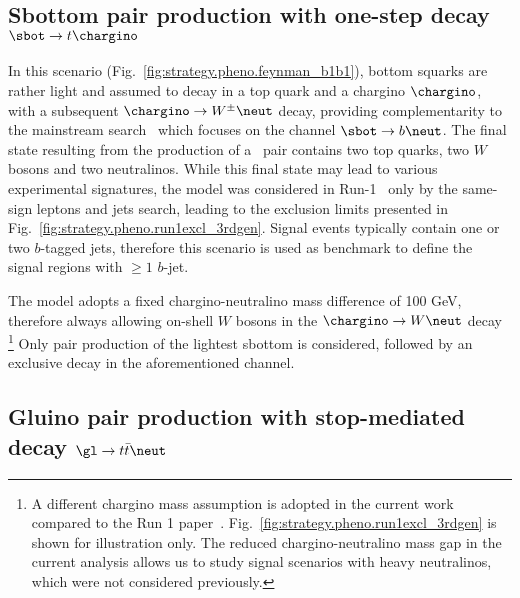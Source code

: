 \subsection*{Sbottom pair production with one-step decay $\sbot\to t\chargino$}
\label{subsec:signals_sbot}

In this scenario (Fig.~\ref{fig:strategy.pheno.feynman_b1b1}), bottom squarks are rather light and assumed to decay in a top quark and a chargino $\chargino$, 
with a subsequent $\chargino\to W^\pm\neut$ decay, 
providing complementarity to the mainstream search~\cite{ATLAS-CONF-2015-066} which focuses on the channel $\sbot\to b\neut$. 
The final state resulting from the production of a \sbsb\ pair contains two top quarks, two $W$ bosons and two neutralinos. 
While this final state may lead to various experimental signatures, 
the model was considered in Run-1~\cite{SUSY-2014-06} 
only by the same-sign leptons and jets search, leading to the exclusion limits presented in Fig.~\ref{fig:strategy.pheno.run1excl_3rdgen}. 
Signal events typically contain one or two $b$-tagged jets, 
therefore this scenario is used as benchmark to define the signal regions with $\ge 1$ $b$-jet. 

The model adopts a fixed chargino-neutralino mass difference of 100 GeV, 
therefore always allowing on-shell $W$ bosons in the $\chargino\to W\neut$ decay
\footnote{A different chargino mass assumption is adopted in the current 
work compared to the Run 1 paper~\cite{SUSY-2014-06}.
Fig.~\ref{fig:strategy.pheno.run1excl_3rdgen} is shown for illustration only.
The reduced chargino-neutralino mass gap in the current analysis 
allows us to study signal scenarios with heavy neutralinos, which were not considered previously.}
Only pair production of the lightest sbottom is considered, followed by an exclusive decay in the aforementioned channel. 


\subsection*{Gluino pair production with stop-mediated decay $\gl\to t\bar t\neut$}
\label{subsec:signals_gtt}

